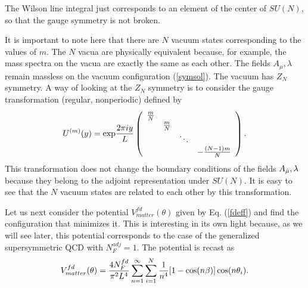 \documentclass[a4paper,12pt]{article}
\begin{document}
The Wilson line integral just corresponds to an element of the 
center of $SU(N)$, so that the gauge symmetry is not broken.
\par
It is important to note here that there are $N$ vacuum states
corresponding to the values of $m$.
The $N$ vacua are physically equivalent
because, for example, the mass spectra on the vacua are exactly the 
same as each other. The fields $A_{\mu}, \lambda$ remain 
massless on the vacuum configuration (\ref{symsol}).
The vacuum has $Z_N$ symmetry. 
A way of looking at the $Z_N$ symmetry is to 
consider the gauge transformation (regular, nonperiodic) defined by
\begin{equation}
U^{(m)}(y)={\rm exp}{{2\pi i y}\over L}
\left(\begin{array}{cccc}
{m\over N}& & & \\
&{m\over N} & &\\
& & \ddots & \\
& & &-{{(N-1)m}\over N}\end{array}\right).
\label{gaugetrf}
\end{equation}
This transformation does not change the boundary conditions of the fields 
$A_{\hat\mu}, \lambda$ because they belong to the adjoint representation
under $SU(N)$. It is easy to see that the $N$ vacuum states are 
related to each other by this transformation.
\par
Let us next consider the potential $V_{matter}^{fd}(\theta)$ given 
by Eq. (\ref{fdeff}) and find 
the configuration that minimizes it. 
This is interesting in its own light because, as we will 
see later, this potential corresponds to the case of 
the generalized supersymmetric QCD with $N_{F}^{adj}=1$. 
The potential is recast as
\begin{equation}
V_{matter}^{fd}(\theta)
={{4N_F^{fd}}\over {\pi^2 L^4}}\sum_{n=1}^{\infty}
\sum_{i=1}^{N}{1\over n^4}[1-\cos(n\beta)]\cos(n\theta_i).
\end{equation}
\end{document}

